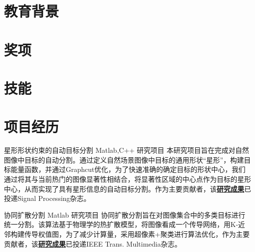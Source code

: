 \documentclass[11pt,a4paper,sans]{moderncv}   %
\title{}                     %
\begin{document}
\begin{CJK}{UTF8}{gbsn}                       %
\maketitle

\section{教育背景}

\section{奖项}

\section{技能}

\section{项目经历}
\renewcommand{\baselinestretch}{1.2}

{星形形状约束的自动目标分割}
{Matlab,C++}
{研究项目}{}
{本研究项目旨在完成对自然图像中目标的自动分割。通过定义自然场景图像中目标的通用形状“星形”，构建目标能量函数，并通过Graphcut优化，为了快速准确的确定目标的形状中心，我们通过将其与当前热门的图像显著性相结合，将显著性区域的中心点作为目标的星形中心，从而实现了具有星形信息的自动目标分割。作为主要贡献者，该\textbf{\href{http://files.cnblogs.com/moondark/XiangliLiao_SRAPC.pdf}{研究成果}}已投递Signal Processing杂志。}
\vspace*{0.2\baselineskip}

{协同扩散分割}
{Matlab}
{研究项目}{}
{协同扩散分割旨在对图像集合中的多类目标进行统一分割。该算法基于物理学的热扩散模型，将图像看成一个传导网络，用K-近邻构建传导权值图，为了减少计算量，采用超像素+聚类进行算法优化，作为主要贡献者，该\textbf{\href{http://files.cnblogs.com/moondark/XiangliLiao_CoDiffusion.pdf}{研究成果}}已投递IEEE Trans. Multimedia杂志。}
\vspace*{0.2\baselineskip}


\end{CJK}
\end{document}
